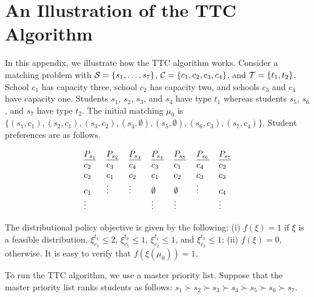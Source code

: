 \documentclass[12pt]{amsart}
\theoremstyle{remark}
\newtheorem{example}{Example}
\begin{document}




\appendix


\section{An Illustration of the TTC Algorithm}\label{subsec:ttcexample}
In this appendix, we illustrate how the TTC algorithm works. Consider a matching problem
with $\mathcal{S}=\{s_1,\ldots,s_7\}$, $\mathcal{C}=\{c_1, c_2, c_3, c_4\}$, and $\mathcal{T}=\{t_1,t_2\}$.
School $c_{1}$ has capacity three, school $c_{2}$ has capacity two, and schools $c_{3}$ and $c_{4}$ have capacity one.
Students $s_{1}$, $s_{2}$, $s_{3}$, and $s_{4}$ have type $t_{1}$ whereas students $s_{5}$, $s_{6}$, and $s_{7}$
have type $t_{2}$. The initial matching $\mu_0$ is $\{(s_1,c_1),(s_2,c_1),(s_3,c_2),(s_4,\emptyset),(s_5,\emptyset),(s_6,c_3),(s_7,c_4)\}$.
Student preferences are as follows.

\[
\begin{tabular}
[c]{lllllll}
$\underline{P_{s_{1}}}$ & $\underline{P_{s_{2}}}$ & $\underline{P_{s_{3}}}$ &
$\underline{P_{s_{4}}}$ & $\underline{P_{s_{5}}}$ & $\underline{P_{s_{6}}}$ &
$\underline{P_{s_{7}}}$\\
$c_{2}$ & $c_{3}$ & $c_{4}$ & $c_{3}$ & $c_{1}$ & $c_{4}$ & $c_{2}$\\
$c_3 $ & $c_{1}$ & $c_{2}$ & $c_{1}$ & $c_{2}$ & $c_3$ & $c_{3}$\\
 $c_1$ & $\vdots$ & $\vdots$ & $\emptyset$ & $\emptyset$ & $\vdots$ & $c_{4}$\\
$\vdots$ &  &  & $\vdots$ & $\vdots$ & & $\vdots$%
\end{tabular}
\]
\smallskip


The distributional policy objective is given by the following: (i) $f(\xi) = 1$ if $\xi$ is a feasible distribution,
$\xi_{c_1}^{t_1} \leq 2$, $\xi_{c_1}^{t_2} \leq 1$, $\xi_{c_2}^{t_1} \leq 1$, and $\xi_{c_2}^{t_2} \leq 1$;  (ii) $f(\xi) = 0$, otherwise. It is easy to verify that $f(\xi(\mu_0)) = 1$.

To run the TTC algorithm, we use a master priority list. Suppose that the master priority list ranks students as follows: $s_1 \succ s_2 \succ s_3 \succ s_4 \succ s_5 \succ s_6 \succ s_7$.
\end{document}
